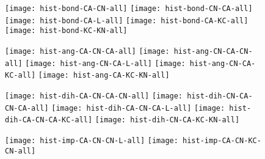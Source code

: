 \documentclass{article}
\begin{document}
\begin{figure}
  \begin{center}
    \begin{minipage}[t]{1.0\textwidth}
      \texttt{[image: hist-bond-CA-CN-all]}
      \texttt{[image: hist-bond-CN-CA-all]}
      \texttt{[image: hist-bond-CA-L-all]}
      \texttt{[image: hist-bond-CA-KC-all]}
      \texttt{[image: hist-bond-KC-KN-all]}
    \end{minipage}
  \end{center}
\end{figure}

\begin{figure}
  \begin{center}
    \begin{minipage}[t]{1.0\textwidth}
      \texttt{[image: hist-ang-CA-CN-CA-all]}
      \texttt{[image: hist-ang-CN-CA-CN-all]}
      \texttt{[image: hist-ang-CN-CA-L-all]}
      \texttt{[image: hist-ang-CN-CA-KC-all]}
      \texttt{[image: hist-ang-CA-KC-KN-all]}
    \end{minipage}
  \end{center}
\end{figure}

\begin{figure}
  \begin{center}
    \begin{minipage}[t]{1.0\textwidth}
      \texttt{[image: hist-dih-CA-CN-CA-CN-all]}
      \texttt{[image: hist-dih-CN-CA-CN-CA-all]}
      \texttt{[image: hist-dih-CA-CN-CA-L-all]}
      \texttt{[image: hist-dih-CA-CN-CA-KC-all]}
      \texttt{[image: hist-dih-CN-CA-KC-KN-all]}
    \end{minipage}
  \end{center}
\end{figure}

\begin{figure}
  \begin{center}
    \begin{minipage}[t]{1.0\textwidth}
      \texttt{[image: hist-imp-CA-CN-CN-L-all]}
      \texttt{[image: hist-imp-CA-CN-KC-CN-all]}
    \end{minipage}
  \end{center}
\end{figure}
\end{document}
